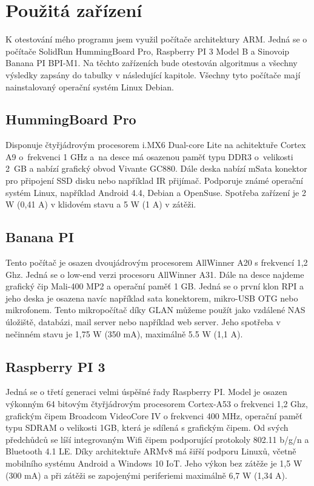 \section{Použitá zařízení}
K otestování mého programu jsem využil počítače architektury ARM. Jedná se o počítače SolidRun HummingBoard Pro, Raspberry PI 3 Model B a Sinovoip Banana PI BPI-M1. Na těchto zařízeních bude otestován algoritmus a všechny výsledky zapsány do tabulky v následující kapitole. Všechny tyto počítače mají nainstalovaný operační systém Linux Debian.

\subsection{HummingBoard Pro}
 Disponuje čtyřjádrovým procesorem i.MX6 Dual-core Lite na achitektuře Cortex A9 o~frekvenci 1 GHz a~na desce má osazenou paměť typu DDR3 o~velikosti 2~GB a nabízí grafický obvod Vivante GC880. Dále deska nabízí mSata konektor pro připojení SSD disku nebo například IR přijímač. Podporuje známé operační systém Linux, například Android 4.4, Debian a OpenSuse. Spotřeba zařízení je 2 W (0,41 A) v klidovém stavu a 5 W (1 A) v zátěži.

\subsection{Banana PI}
Tento počítač je osazen dvoujádrovým procesorem AllWinner A20 s frekvencí 1,2 Ghz. Jedná se o low-end verzi procesoru AllWinner A31. Dále na desce najdeme grafický čip Mali-400 MP2 a operační paměť 1 GB. Jedná se o první klon RPI a jeho deska je osazena navíc například sata konektorem, mikro-USB OTG nebo mikrofonem. Tento mikropočítač díky GLAN můžeme použít jako vzdálené NAS úložiště, databázi, mail server nebo například web server. Jeho spotřeba v nečinném stavu je 1,75 W (350 mA), maximálně 5.5 W (1,1 A).

\subsection{Raspberry PI 3}
Jedná se o třetí generaci velmi úspěšné řady Raspberry PI. Model je osazen výkonným 64 bitovým čtyřjádrovým procesorem Cortex-A53 o frekvenci 1,2 Ghz, grafickým čipem Broadcom VideoCore IV o frekvenci 400 MHz, operační paměť typu SDRAM o velikosti 1GB, která je sdílená s grafickým čipem. Od svých předchůdců se líší integrovaným Wifi čipem podporující protokoly 802.11 b/g/n a Bluetooth 4.1 LE. Díky architektuře ARMv8 má šiřší podporu Linuxů, včetně mobilního systému Android a Windows 10 IoT. Jeho výkon bez zátěže je 1,5 W (300 mA) a při zátěži se zapojenými periferiemi maximálně 6,7 W (1,34 A).

